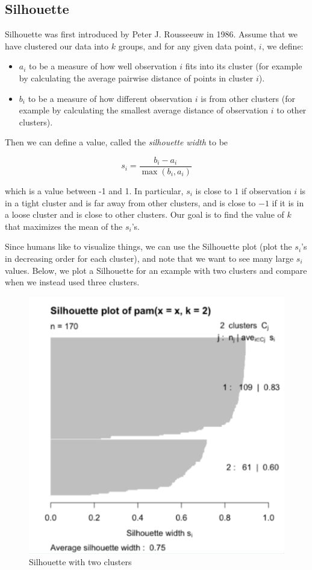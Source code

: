 \subsection*{Silhouette}

Silhouette was first introduced by Peter J. Rousseeuw in 1986. Assume that we have clustered our data into $k$ groups, and for any given data point, $i$, we define:


\begin{itemize}
\item $a_i$ to be a measure of how well observation $i$ fits into its cluster (for example by calculating the average pairwise distance of points in cluster $i$).
\item $b_i$ to be a measure of how different observation $i$ is from other clusters (for example by calculating the smallest average distance of observation $i$ to other clusters).
\end{itemize}


Then we can define a value, called the \emph{silhouette width} to be

$$s_i = \frac{b_i - a_i}{\max(b_i, a_i)}$$

which is a value between -1 and 1. In particular, $s_i$ is close to $1$ if observation $i$ is in a tight cluster and is far away from other clusters, and is close to $-1$ if it is in a loose cluster and is close to other clusters. Our goal is to find the value of $k$ that maximizes the mean of the $s_i$'s.

Since humans like to visualize things, we can use the Silhouette plot (plot the $s_i$'s in decreasing order for each cluster), and note that we want to see many large $s_i$ values. Below, we plot a Silhouette for an example with two clusters and compare when we instead used three clusters.


\begin{figure}[H]
\begin{center}
\includegraphics[scale=0.4]{silhouette2.png}
\end{center}
\caption{Silhouette with two clusters}
\label{fig:sil2}
\end{figure}



